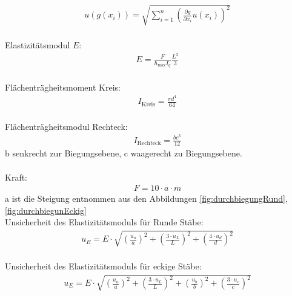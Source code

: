 \begin{align}
	u(g(x_i))=   \sqrt{  \sum_{i=1}^{n} \left( \frac{\partial g}{\partial x_i} u(x_i) \right)^2  }
	\label{eq:kombsu}       
\end{align} 
\\
Elastizitätsmodul $E$:
\begin{align}
	E=\frac{F}{h_{\text{max}} I_q}\frac{L^3}{3}
	\label{eq:Elast}
\end{align}
\\
Flächenträgheitsmoment Kreis:
\begin{align}
	I_{\text{Kreis}}=\frac{\pi d^4}{64}
		\label{eq:TrägKreis}
\end{align}
\\
Flächenträgheitsmodul Rechteck:
\begin{align}		
	I_{\text{Rechteck}}= \frac{bc^3}{12}
	\label{eq:TrägRecht}
\end{align}
b senkrecht zur Biegungsebene, c waagerecht zu Biegungsebene.
\\
\\
Kraft:
\begin{align}
	F=10 \cdot a \cdot m
	\label{eq:Kraft}
\end{align}
	a ist die Steigung entnommen aus den Abbildungen \ref{fig:durchbiegungRund}, \ref{fig:durchbiegunEckig}
\\
Unsicherheit des Elastizitätsmoduls für Runde Stäbe:
\begin{align}
	u_E= E\cdot \sqrt{\left(\frac{u_a}{a}\right)^2+ \left(\frac{3\cdot u_L}{L}\right)^2 + \left( \frac{4 \cdot u_d}{d}\right)^2}
	\label{eq:UElastRund}
\end{align}	
\\
Unsicherheit des Elastizitätsmoduls für eckige Stäbe:
\begin{align}
	u_E= E \cdot \sqrt{ \left(\frac{u_a}{a}\right)^2 + \left( \frac{3 \cdot u_L}{L}\right)^2 + \left( \frac{u_b}{b}\right)^2 + \left(\frac{3 \cdot u_c}{c} \right)^2}
	\label{eq:UElastEckig}
\end{align}
	
	


